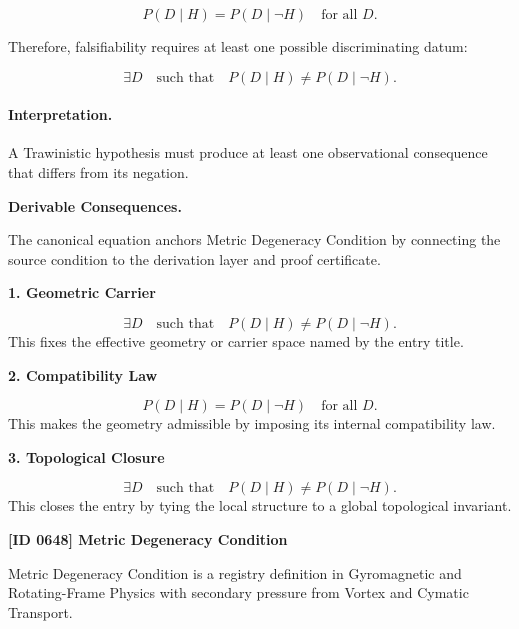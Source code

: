 \begin{equation}
P(D\mid H)=P(D\mid \neg H)
\quad
\text{for all }D .
\end{equation}

Therefore, falsifiability requires at least one possible discriminating datum:

\begin{equation}
\boxed{
\exists D
\quad\text{such that}\quad
P(D\mid H)\neq P(D\mid \neg H).
}
\end{equation}

\paragraph{Interpretation.}
A Trawinistic hypothesis must produce at least one observational consequence that differs from its negation.

\par\vspace{0.35em}
\noindent\textbf{Derivable Consequences.}\quad
\begingroup
\footnotesize
\raggedright
The canonical equation anchors Metric Degeneracy Condition by connecting the source condition to the derivation layer and proof certificate.
\par\endgroup

\noindent\textbf{1. Geometric Carrier}\par
\[
\exists D \quad\text{such that}\quad P(D\mid H)\neq P(D\mid \neg H).
\]
\noindent This fixes the effective geometry or carrier space named by the entry title.\par
\noindent\textbf{2. Compatibility Law}\par
\[
P(D\mid H)=P(D\mid \neg H) \quad \text{for all }D.
\]
\noindent This makes the geometry admissible by imposing its internal compatibility law.\par
\noindent\textbf{3. Topological Closure}\par
\[
\boxed{ \exists D \quad\text{such that}\quad P(D\mid H)\neq P(D\mid \neg H). }
\]
\noindent This closes the entry by tying the local structure to a global topological invariant.\par

\clearpage
\noindent\textbf{[ID 0648] Metric Degeneracy Condition}\par
\vspace{0.35em}
\begingroup\small
{}
Metric Degeneracy Condition is a registry definition in Gyromagnetic and Rotating-Frame Physics with secondary pressure from Vortex and Cymatic Transport.

